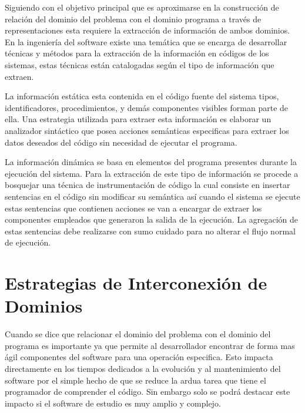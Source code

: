 \documentclass[12pt]{report}
\begin{document}

Siguiendo con el objetivo principal que es aproximarse en la construcción de relación del dominio del problema con el dominio programa a través de representaciones esta requiere la extracción de información de ambos dominios. En la ingeniería del software existe una temática que se encarga de desarrollar técnicas y métodos para la extracción de la información en códigos de los sistemas, estas técnicas están catalogadas según el tipo de información que extraen.


La información estática esta contenida en el código fuente del sistema 
tipos, identificadores, procedimientos, y demás componentes visibles forman parte de ella. Una estrategia utilizada para extraer esta información es elaborar un analizador sintáctico que posea acciones semánticas especificas para extraer los datos deseados del código sin necesidad de ejecutar el programa. 


La información dinámica se basa en elementos del programa presentes durante la ejecución del sistema. Para la extracción de este tipo de información se procede a bosquejar una técnica de instrumentación de código la cual consiste en insertar sentencias en el código sin modificar su semántica así cuando el sistema se ejecute estas sentencias que contienen acciones se van a encargar de extraer los componentes empleados que generaron la salida de la ejecución.
La agregación de estas sentencias debe realizarse con sumo cuidado para no alterar el flujo normal de ejecución.

\section{Estrategias de Interconexión de \\Dominios}

Cuando se dice que relacionar el dominio del problema con el dominio del programa es importante ya que permite al desarrollador encontrar de forma  mas ágil componentes del software para una operación especifica. Esto impacta directamente en los tiempos dedicados a la evolución y al mantenimiento del software por el simple hecho de que se reduce la ardua tarea que tiene el programador de comprender el código.
Sin embargo solo se podrá destacar este impacto si el software de estudio es muy amplio y complejo.
\end{document}
